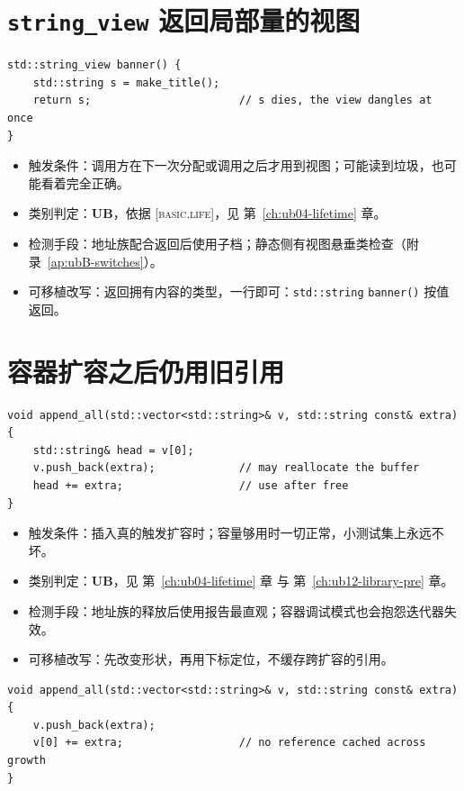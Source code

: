 \documentclass[12pt,a4paper,fontset=fandol]{ctexbook}
\newcommand{\Fn}[1]{\texttt{#1()}}
\newcommand{\Tp}[1]{\texttt{#1}}
\newcommand{\Bk}{\discretionary{}{}{}}
\newcommand{\UB}{\textbf{\textsf{UB}}}
\newcommand{\Std}[1]{\textsc{[#1]}}
\begin{document}
\section{\Tp{string\_view} 返回局部量的视图}
\begin{lstlisting}[style=cppstyle, caption={反例：视图短于它指向的缓冲}]
std::string_view banner() {
    std::string s = make_title();
    return s;                       // s dies, the view dangles at once
}
\end{lstlisting}
\begin{itemize}
\item 触发条件：调用方在下一次分配或调用之后才用到视图；可能读到垃圾，也可能看着完全正确。
\item 类别判定：\UB{}，依据 \Std{basic{\Bk}.life}，见 第~\ref{ch:ub04-lifetime} 章。
\item 检测手段：地址族配合返回后使用子档；静态侧有视图悬垂类检查（附录~\ref{ap:ubB-switches}）。
\item 可移植改写：返回拥有内容的类型，一行即可：\Tp{std::{\Bk}string} \Fn{banner} 按值返回。
\end{itemize}

\section{容器扩容之后仍用旧引用}
\begin{lstlisting}[style=cppstyle, caption={反例：引用跨过可能发生的重新分配}]
void append_all(std::vector<std::string>& v, std::string const& extra) {
    std::string& head = v[0];
    v.push_back(extra);             // may reallocate the buffer
    head += extra;                  // use after free
}
\end{lstlisting}
\begin{itemize}
\item 触发条件：插入真的触发扩容时；容量够用时一切正常，小测试集上永远不坏。
\item 类别判定：\UB{}，见 第~\ref{ch:ub04-lifetime} 章 与 第~\ref{ch:ub12-library-pre} 章。
\item 检测手段：地址族的释放后使用报告最直观；容器调试模式也会抱怨迭代器失效。
\item 可移植改写：先改变形状，再用下标定位，不缓存跨扩容的引用。
\end{itemize}
\begin{lstlisting}[style=cppstyle, caption={改写：扩容之后再取元素}]
void append_all(std::vector<std::string>& v, std::string const& extra) {
    v.push_back(extra);
    v[0] += extra;                  // no reference cached across growth
}
\end{lstlisting}
\end{document}
